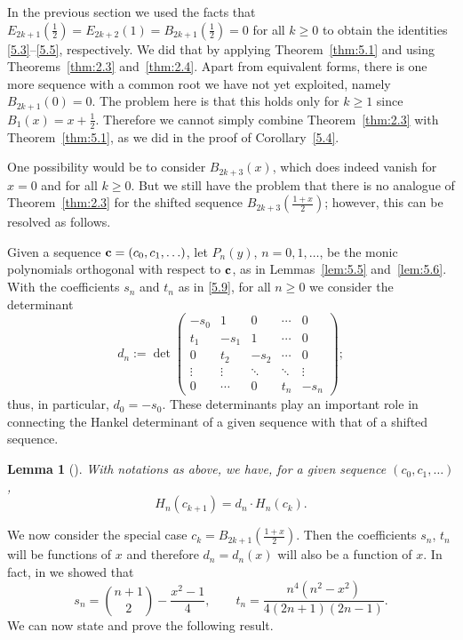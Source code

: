 \documentclass{amsart}
\theoremstyle{plain}
\newtheorem{lemma}[theorem]{Lemma}
\numberwithin{equation}{section}
\begin{document}
In the previous section we used the facts that 
$E_{2k+1}(\tfrac{1}{2})=E_{2k+2}(1)=B_{2k+1}(\tfrac{1}{2})$$=0$ for all $k\geq 0$
to obtain the identities \eqref{5.3}--\eqref{5.5}, respectively. We did that by
applying Theorem~\ref{thm:5.1} and using Theorems~\ref{thm:2.3} 
and~\ref{thm:2.4}. Apart from equivalent forms, there is one more sequence with
a common root we have not yet exploited, namely $B_{2k+1}(0)=0$. The problem
here is that this holds only for $k\geq 1$ since $B_1(x)=x+\tfrac{1}{2}$. 
Therefore
we cannot simply combine Theorem~\ref{thm:2.3} with Theorem~\ref{thm:5.1}, as
we did in the proof of Corollary~\ref{5.4}.

One possibility would be to consider $B_{2k+3}(x)$, which does indeed vanish 
for $x=0$ and for all $k\geq 0$. But we still have the problem that there is
no analogue of Theorem~\ref{thm:2.3} for the shifted sequence 
$B_{2k+3}(\tfrac{1+x}{2})$; however, this can be resolved as follows.

Given a sequence ${\bf c}=(c_0, c_1,\ldots)$, let $P_n(y)$, $n=0,1,\ldots$, be
the monic polynomials orthogonal with respect to ${\bf c}$, as in 
Lemmas~\ref{lem:5.5} and~\ref{lem:5.6}. With the coefficients $s_n$ and $t_n$
as in \eqref{5.9}, for all $n\geq 0$ we consider the determinant
\begin{equation}\label{6a.1}
d_{n}:=\det\begin{pmatrix}
-s_{0} & 1 & 0 & \cdots & 0\\
t_{1} & -s_{1} & 1 & \cdots & 0\\
0 & t_{2} & -s_{2} & \cdots & 0\\
\vdots & \vdots &  \ddots & \ddots & \vdots\\
0 & \cdots & 0 & t_{n} & -s_{n}
\end{pmatrix};
\end{equation}
thus, in particular, $d_0=-s_0$. These determinants play an important role in
connecting the Hankel determinant of a given sequence with that of a shifted
sequence.

\begin{lemma}[{\cite[Prop.~1.2]{MWY}}]\label{lem:6a.1}
With notations as above, we have, for a given sequence $(c_0, c_1,\ldots)$,
\begin{equation}\label{6a.2}
H_{n}(c_{k+1}) = d_{n}\cdot H_{n}(c_{k}).
\end{equation}
\end{lemma}

We now consider the special case $c_k=B_{2k+1}(\tfrac{1+x}{2})$. Then the
coefficients $s_n$, $t_n$ will be functions of $x$ and therefore $d_n=d_n(x)$
will also be a function of $x$. In fact, in \cite[Theorem~4.1]{DJ} we showed 
that
\begin{equation}\label{6a.5}
s_{n}=\binom{n+1}{2}-\frac{x^{2}-1}{4},\qquad
t_{n}=\frac{n^{4}(n^2-x^{2})}{4(2n+1)(2n-1)}.
\end{equation}
We can now state and prove the following result.
\end{document}
